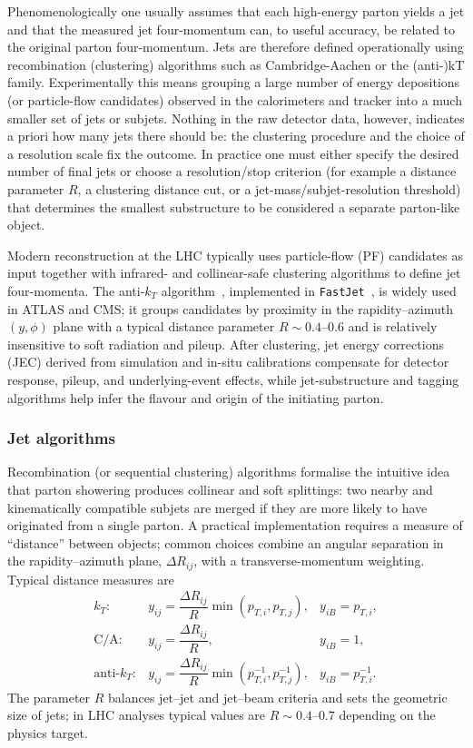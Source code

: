 Phenomenologically one usually assumes that each high-energy parton yields a jet and that the measured jet four-momentum can, to useful accuracy, be related to the original parton four-momentum. Jets are therefore defined operationally using recombination (clustering) algorithms such as Cambridge-Aachen or the (anti-)kT family. Experimentally this means grouping a large number of energy depositions (or particle-flow candidates) observed in the calorimeters and tracker into a much smaller set of jets or subjets. Nothing in the raw detector data, however, indicates a priori how many jets there should be: the clustering procedure and the choice of a resolution scale fix the outcome. In practice one must either specify the desired number of final jets or choose a resolution/stop criterion (for example a distance parameter \(R\), a clustering distance cut, or a jet-mass/subjet-resolution threshold) that determines the smallest substructure to be considered a separate parton-like object.

Modern reconstruction at the LHC typically uses particle-flow (PF) candidates as input together with infrared- and collinear-safe clustering algorithms to define jet four-momenta. The anti-\(k_T\) algorithm~\parencite{Cacciari:2008gp}, implemented in \texttt{FastJet}~\parencite{Cacciari:2011ma}, is widely used in ATLAS and CMS; it groups candidates by proximity in the rapidity–azimuth \((y,\phi)\) plane with a typical distance parameter \(R\sim0.4\)–0.6 and is relatively insensitive to soft radiation and pileup. After clustering, jet energy corrections (JEC) derived from simulation and in-situ calibrations compensate for detector response, pileup, and underlying-event effects, while jet-substructure and tagging algorithms help infer the flavour and origin of the initiating parton.

\subsubsection{Jet algorithms}

Recombination (or sequential clustering) algorithms formalise the intuitive idea that parton showering produces collinear and soft splittings: two nearby and kinematically compatible subjets are merged if they are more likely to have originated from a single parton. A practical implementation requires a measure of ``distance'' between objects; common choices combine an angular separation in the rapidity–azimuth plane, \(\Delta R_{ij}\), with a transverse-momentum weighting. Typical distance measures are
\[
\begin{array}{lll}
k_T: & y_{ij}=\dfrac{\Delta R_{ij}}{R}\min(p_{T,i},p_{T,j}), & y_{iB}=p_{T,i},\\[6pt]
\mathrm{C/A}: & y_{ij}=\dfrac{\Delta R_{ij}}{R}, & y_{iB}=1,\\[6pt]
\text{anti-}k_T: & y_{ij}=\dfrac{\Delta R_{ij}}{R}\min(p_{T,i}^{-1},p_{T,j}^{-1}), & y_{iB}=p_{T,i}^{-1}.
\end{array}
\]
The parameter \(R\) balances jet–jet and jet–beam criteria and sets the geometric size of jets; in LHC analyses typical values are \(R\sim0.4\text{--}0.7\) depending on the physics target.

